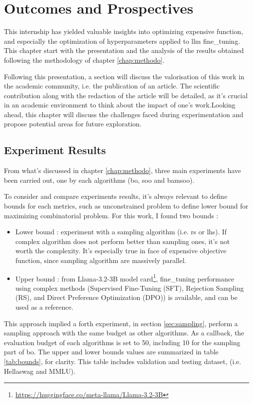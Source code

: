 \chapter{Outcomes and Prospectives}
\label{chap:outcomes}

This internship has yielded valuable insights into optimizing expensive function, and especially the optimization of hyperparameters applied to \acrshort{llm} \gls{fine_tuning}. This chapter start with the presentation and the analysis of the results obtained following the methodology of chapter \ref{chap:methodo}.

Following this presentation, a section will discuss the valorisation of this work in the academic community, i.e. the publication of an article. The scientific contribution along with the redaction of the article will be detailed, as it's crucial in an academic environment to think about the impact of one's work.Looking ahead, this chapter will discuss the challenges faced during experimentation and propose potential areas for future exploration. 



\section{Experiment Results}
\label{sec:exp_results}
From what's discussed in chapter \ref{chap:methodo}, three main experiments have been carried out, one by each algorithms (\acrshort{bo}, \acrshort{soo} and \acrshort{bamsoo}). 

To consider and compare experiments results, it's always relevant to define bounds for each metrics, such as unconstrained problem to define lower bound for maximizing combinatorial problem. For this work, I found two bounds : 
\begin{itemize}
    \item Lower bound : experiment with a sampling algorithm (i.e. \acrshort{rs} or \acrshort{lhs}). If complex algorithm does not perform better than sampling ones, it's not worth the complexity. It's especially true in face of expensive objective function, since sampling algorithm are massively parallel.
    \item Upper bound : from Llama-3.2-3B model card\footnote{\href{https://huggingface.co/meta-llama/Llama-3.2-3B}{https://huggingface.co/meta-llama/Llama-3.2-3B}}, \gls{fine_tuning} performance using complex methods (Supervised Fine-Tuning (SFT), Rejection Sampling (RS), and Direct Preference Optimization (DPO)) is available, and can be used as a reference.
\end{itemize}
This approach implied a forth experiment, in section \ref{sec:sampling}, perform a sampling approach with the same budget as other algorithms. As a callback, the evaluation budget of each algorithms is set to 50, including 10 for the sampling part of \acrshort{bo}. The upper and lower bounds values are summarized in table \ref{tab:bounds}, for clarity. This table includes validation and testing dataset, (i.e. Hellaswag and MMLU).


